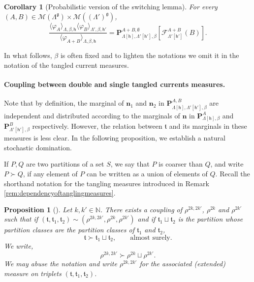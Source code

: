 \documentclass[11pt,a4paper]{article}
\newtheorem{proposition}[theorem]{Proposition}
\newtheorem{corollary}[theorem]{Corollary}
\theoremstyle{definition}
\numberwithin{equation}{section}
\newcommand\n{\mathbf{n}}
\newcommand\fg{\mathfrak{g}}
\newcommand\ft{\mathfrak{t}}
\begin{document}
\begin{corollary}[Probabilistic version of the switching lemma]\label{thm: probabilistic switching rtc}
For every $(A,B)\in \mathcal{M}(\Lambda^\fg)\times \mathcal{M}((\Lambda')^\fg)$,
\begin{equation}
    \frac{\langle \varphi_A\rangle_{\Lambda,\beta,\mathsf{h}}\langle \varphi_B\rangle_{\Lambda',\beta,\mathsf{h}'}}{\langle \varphi_{A+B}\rangle_{\Lambda,\beta,\mathsf{h}}}=\mathbf{P}^{A+B,\emptyset}_{\Lambda[\mathsf{h}],\Lambda'[\mathsf{h}'],\beta}[\mathcal{F}_{\Lambda'[\mathsf{h}']}^{A+B}(B)].
\end{equation}
\end{corollary}

In what follows, $\beta$ is often fixed and to lighten the notations we omit it in the notation of the tangled current measures.


\paragraph{Coupling between double and single tangled currents measures.}
Note that by definition, the marginal of $\n_1$ and $\n_2$ in $\mathbf{P}_{\Lambda[\mathsf{h}],\Lambda'[\mathsf{h}'],\beta}^{A,B}$ are independent and distributed according to the marginals of $\n$ in $\mathbf P^{A}_{\Lambda[\mathsf{h}],\beta}$ and $\mathbf P^{B}_{\Lambda'[\mathsf{h'}],\beta}$ respectively. However, the relation between $\ft$ and its marginals in these measures is less clear. In the following proposition, we establish a natural stochastic domination.

If $P,Q$ are two partitions of a set $S$, we say that $P$ is coarser than $Q$, and write $P\succ Q$, if any element of $P$ can be written as a union of elements of $Q$. Recall the shorthand notation for the tangling measures introduced in Remark \ref{rem:dependencyoftanglingmeasures}.

\begin{proposition}[]\label{prop:tanglings_domination}
Let $k,k'\in\mathbb N$. 
There exists a coupling of $\rho^{2k,2k'}$, $\rho^{2k}$ and $\rho^{2k'}$ such that if $(\ft,\ft_1,\ft_2)\sim (\rho^{2k,2k'},\rho^{2k},\rho^{2k'})$ and if $\ft_1\sqcup \ft_2$ is the partition whose partition classes are the partition classes of $\ft_1$ and $\ft_2$,
\begin{equation}
    \ft \succ \ft_1\sqcup \ft_2, \qquad \text{almost surely.}
\end{equation}
We write, 
\begin{equation}\label{eq: domination}
    \rho^{2k,2k'} 
    \succ
    \rho^{2k}\sqcup\rho^{2k'}.
\end{equation}
We may abuse the notation and write $\rho^{2k,2k'}$ for the associated (extended) measure on triplets $(\ft,\ft_1,\ft_2)$.
\end{proposition}
\end{document}
